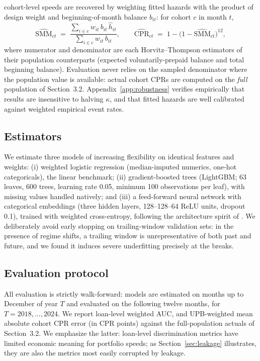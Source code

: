 \documentclass[11pt]{article}
\begin{document}
cohort-level speeds are recovered by weighting fitted hazards with the product of design weight
and beginning-of-month balance $b_{it}$: for cohort $c$ in month $t$,
\begin{equation}
\widehat{\mathrm{SMM}}_{ct} \;=\; \frac{\sum_{i \in c} w_{it}\, b_{it}\, \hat h_{it}}
{\sum_{i \in c} w_{it}\, b_{it}}, \qquad
\widehat{\mathrm{CPR}}_{ct} \;=\; 1 - \bigl(1 - \widehat{\mathrm{SMM}}_{ct}\bigr)^{12},
\end{equation}
where numerator and denominator are each Horvitz--Thompson estimators of their population
counterparts (expected voluntarily-prepaid balance and total beginning balance). Evaluation
never relies on the sampled denominator where the population value is available: actual cohort
CPRs are computed on the \emph{full} population of Section~3.2. Appendix~\ref{app:robustness}
verifies empirically that results are insensitive to halving $\kappa$, and that fitted hazards
are well calibrated against weighted empirical event rates.

\subsection{Estimators}

We estimate three models of increasing flexibility on identical features and weights: (i)
weighted logistic regression (median-imputed numerics, one-hot categoricals), the linear
benchmark; (ii) gradient-boosted trees (LightGBM; 63 leaves, 600 trees, learning rate 0.05,
minimum 100 observations per leaf), with missing values handled natively; and (iii) a
feed-forward neural network with categorical embeddings (three hidden layers, 128--128--64 ReLU
units, dropout 0.1), trained with weighted cross-entropy, following the architecture spirit of
\citet{sadhwani2021deep}. We deliberately avoid early stopping on trailing-window validation sets:
in the presence of regime shifts, a trailing window is unrepresentative of both past and future,
and we found it induces severe underfitting precisely at the breaks.

\subsection{Evaluation protocol}

All evaluation is strictly walk-forward: models are estimated on months up to December of year
$T$ and evaluated on the following twelve months, for $T = 2018, \dots, 2024$. We report
loan-level weighted AUC, and UPB-weighted mean absolute cohort CPR error (in CPR points) against
the full-population actuals of Section~3.2. We emphasize the latter: loan-level discrimination
metrics have limited economic meaning for portfolio speeds; as Section~\ref{sec:leakage}
illustrates, they are also the metrics most easily corrupted by leakage.
\end{document}
